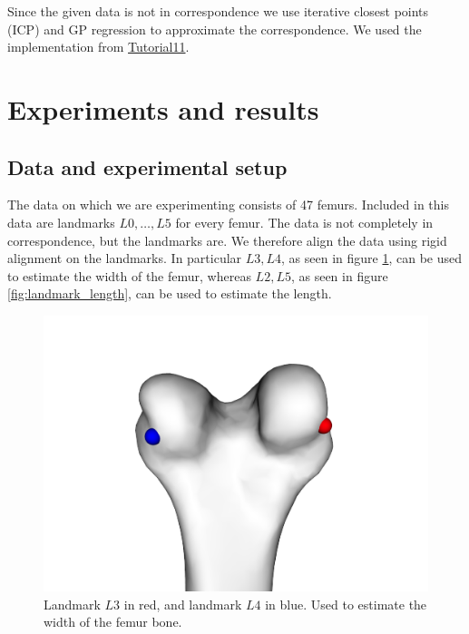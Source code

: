\documentclass[10pt]{article}
\theoremstyle{definition}
\begin{document}
Since the given data is not in correspondence we use iterative closest points (ICP) and GP regression to approximate the correspondence. We used the implementation from \href{https://scalismo.org/docs/Tutorials/tutorial11}{Tutorial11}.




\newpage
\section{Experiments and results}
\subsection{Data and experimental setup}


The data on which we are experimenting consists of 47 femurs. Included in this data are landmarks $L0,\dots,L5$ for every femur. The data is not completely in correspondence, but the landmarks are. We therefore align the data using rigid alignment on the landmarks.
In particular $L3,L4$, as seen in figure \ref{fig:landmark_width}, can be used to estimate the width of the femur, whereas $L2,L5$, as seen in figure \ref{fig:landmark_length}, can be used to estimate the length.

\begin{figure}[h]
\centering
\includegraphics[scale=0.2]{screenshots/length_L3red_L4blue.png}
\caption{Landmark $L3$ in red, and landmark $L4$ in blue. Used to estimate the width of the femur bone.}
\label{fig:landmark_width}
\end{figure}
\end{document}
